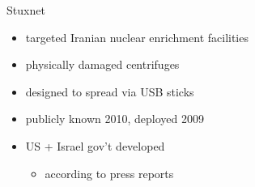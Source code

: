 
\begin{frame}{Stuxnet}
    \begin{itemize}
        \item targeted Iranian nuclear enrichment facilities
        \item physically damaged centrifuges
        \item designed to spread via USB sticks
        \item publicly known 2010, deployed 2009
        \item US + Israel gov't developed
            \begin{itemize}
            \item according to press reports
            \end{itemize}
    \end{itemize}
\end{frame}


